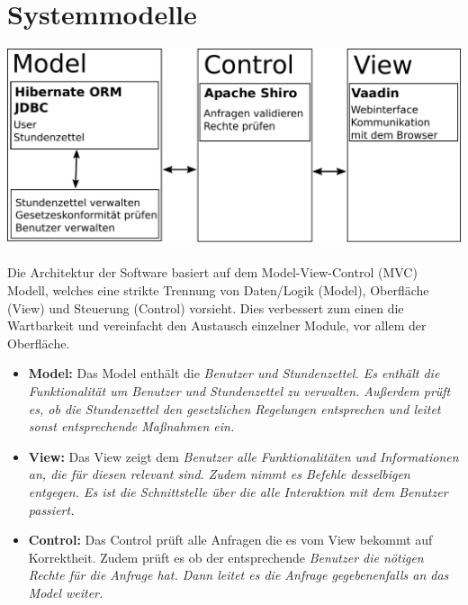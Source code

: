 \section{Systemmodelle}

\includegraphics[width=\linewidth]{mvc.pdf}\\
\\
Die Architektur der Software basiert auf dem Model-View-Control (MVC) Modell, welches eine strikte Trennung von Daten/Logik (Model), Oberfläche (View) und Steuerung (Control) vorsieht.
Dies verbessert zum einen die Wartbarkeit und vereinfacht den Austausch einzelner Module, vor allem der Oberfläche.
\begin{itemize}
	\item \textbf{Model:}
		Das Model enthält die \em{Benutzer} und \em{Stundenzettel}.
		Es enthält die Funktionalität um \em{Benutzer} und Stundenzettel zu verwalten.
		Außerdem prüft es, ob die \em{Stundenzettel} den gesetzlichen Regelungen entsprechen und leitet sonst entsprechende Maßnahmen ein.
	\item \textbf{View:}
		Das View zeigt dem \em{Benutzer} alle Funktionalitäten und Informationen an, die für diesen relevant sind.
		Zudem nimmt es Befehle desselbigen entgegen.
		Es ist die Schnittstelle über die alle Interaktion mit dem \em{Benutzer} passiert.
	\item \textbf{Control:}
		Das Control prüft alle Anfragen die es vom View bekommt auf Korrektheit.
		Zudem prüft es ob der entsprechende \em{Benutzer} die nötigen Rechte für die Anfrage hat.
		Dann leitet es die Anfrage gegebenenfalls an das Model weiter.
\end{itemize}
